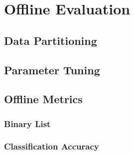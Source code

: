 \section{Offline Evaluation}

\subsection{Data Partitioning}

\subsection{Parameter Tuning}

\subsection{Offline Metrics}

\subsubsection{Binary List}

\subsubsection{Classification Accuracy}

